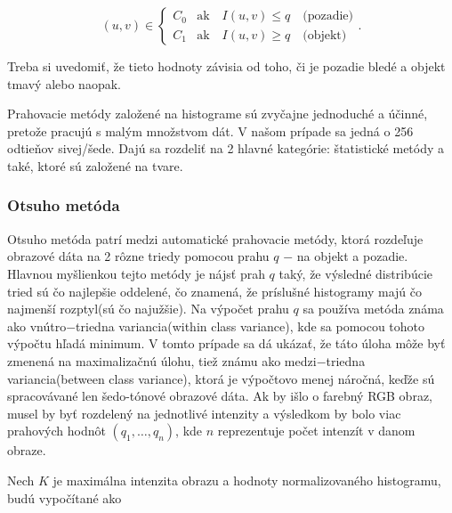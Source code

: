 \documentclass[a4paper,11pt,oneside]{article}%
\begin{document}
\begin{equation}
(u, v) \in \begin{cases} C_0 & \text{ak} \hspace{1em} I(u,v) \leq q \hspace{1em} \text{(pozadie)} \\  C_1 & \text{ak} \hspace{1em} I(u,v) \geq q \hspace{1em} \text{(objekt)} \end{cases}.
\end{equation}

Treba si uvedomiť, že tieto hodnoty závisia od toho, či je pozadie bledé a objekt tmavý alebo naopak.

Prahovacie metódy založené na histograme sú zvyčajne jednoduché a účinné, pretože pracujú s malým množstvom dát. V našom prípade sa jedná o 256 odtieňov sivej/šede. Dajú sa rozdeliť na 2 hlavné kategórie: štatistické metódy a také, ktoré sú založené na tvare.


\subsubsection{Otsuho metóda} \label{OtsuM}
Otsuho metóda\cite{otsu} patrí medzi automatické  prahovacie metódy, ktorá rozdeľuje obrazové dáta na 2 rôzne triedy pomocou prahu $q$ $-$ na objekt a pozadie. Hlavnou myšlienkou tejto metódy je nájsť prah $q$ taký, že výsledné distribúcie tried sú čo najlepšie oddelené, čo znamená, že príslušné histogramy majú čo najmenší rozptyl(sú čo najužšie). Na výpočet prahu $q$ sa používa metóda známa ako vnútro$-$triedna variancia(within class variance), kde sa pomocou tohoto výpočtu hľadá minimum. V tomto prípade sa dá ukázať, že táto úloha môže byť zmenená na maximalizačnú úlohu, tiež známu ako medzi$-$triedna variancia(between class variance), ktorá je výpočtovo menej náročná, keďže sú spracovávané len šedo-tónové obrazové dáta. Ak by išlo o farebný RGB obraz, musel by byť rozdelený na jednotlivé intenzity a výsledkom by bolo viac prahových hodnôt $(q_1, \ldots, q_n)$, kde $n$ reprezentuje počet intenzít v danom obraze.

Nech $K$ je maximálna intenzita obrazu a hodnoty normalizovaného histogramu, budú vypočítané ako
\end{document}
